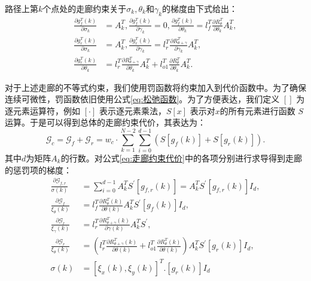 \documentclass[master,academic]{ysuthesis} %
\begin{document}
		路径上第$k$个点处的走廊约束关于$\sigma_k,\theta_k$和$\gamma_k$的梯度由下式给出：
		\begin{equation}
			\begin{aligned}
			\frac{\partial g_{f}^{T}(k)}{\partial \sigma _k}&=A_{k}^{T},\frac{\partial g_{f}^{T}(k)}{\partial \gamma _k}=0,\frac{\partial g_{f}^{T}(k)}{\partial \theta _k}=l_{f}^{T}\frac{\partial R_{\theta}^{T}}{\partial \theta _k}A_{k}^{T},\\
			\frac{\partial g_{r}^{T}(k)}{\partial \sigma _k}&=A_{k}^{T},\frac{\partial g_{r}^{T}(k)}{\partial \gamma _k}=l_{r}^{T}\frac{\partial R_{\theta +\gamma}^{T}}{\partial \gamma _k}A_{k}^{T},\\
			\frac{\partial g_{r}^{T}(k)}{\partial \theta _k}&=l_{r}^{T}\frac{\partial R_{\theta +\gamma}^{T}}{\partial \theta _k}A_{k}^{T}+l_{o1}^{T}\frac{\partial R_{\theta}^{T}}{\partial \theta _k}A_{k}^{T}.
			\end{aligned}
		\end{equation}

		对于上述走廊的不等式约束，我们使用罚函数将约束加入到代价函数中。为了确保连续可微性，罚函数依旧使用公式\ref{eq:松弛函数}。为了方便表达，我们定义 \([]\) 为逐元素运算符，例如 \([\cdot]\) 表示逐元素乘法，\(S[x]\) 表示对$x$的所有元素进行函数 \(S\)运算。于是可以得到总体的走廊约束代价，其表达为：
		\begin{equation}
			\mathcal{G}_c =\mathcal{G}_{f}+\mathcal{G}_{r}=w_{c}\cdot \sum_{k=1}^{N-2}\sum_{i=0}^{d-1}(S[g_f(k)] + S[g_r(k)]).\label{eq:走廊约束代价}
		\end{equation}
		其中$d$为矩阵$A_k$的行数。对公式\ref{eq:走廊约束代价}中的各项分别进行求导得到走廊的惩罚项的梯度：
		\begin{equation}
			\begin{aligned}
				\frac{\partial \mathcal{G}_{f,r}}{\sigma \left( k \right)}&=\sum_{i=0}^{d-1}{A}_{k}^{T}S^{'}\left[ g_{f,r}\left( k \right) \right] =A_{k}^{T}S^{'}\left[ g_{f,r}\left( k \right) \right] I_d,\\
				\frac{\partial \mathcal{G}_f}{\xi _{\theta}\left( k \right)}&=l_{f}^{T}\frac{\partial R_{\theta}^{T}\left( k \right)}{\partial \theta \left( k \right)}A_{k}^{T}S^{'}\left[ g_f\left( k \right) \right] I_d,\\
				\frac{\partial \mathcal{G}_r}{\xi _{\gamma}\left( k \right)}&=l_{r}^{T}\frac{\partial R_{\theta +\gamma}^{T}\left( k \right)}{\partial \gamma \left( k \right)}A_{k}^{T}S^{'},\\
				\frac{\partial \mathcal{G}_r}{\xi _{\theta}\left( k \right)}&=\left( l_{r}^{T}\frac{\partial R_{\theta +\gamma}^{T}\left( k \right)}{\partial \theta \left( k \right)}+l_{o1}^{T}\frac{\partial R_{\theta}^{T}\left( k \right)}{\partial \theta \left( k \right)} \right) A_{k}^{T}S^{'}\left[ g_r\left( k \right) \right] I_d,\\
				\sigma \left( k \right) &=\left[ \xi _x\left( k \right) ,\xi _y\left( k \right) \right] ^T.\left[ g_r\left( k \right) \right] I_d
			\end{aligned}
		\end{equation}
		
\end{document}
